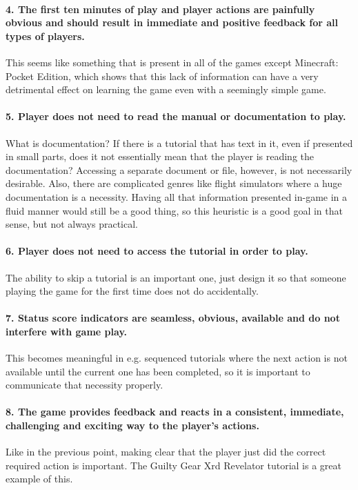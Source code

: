 \paragraph{4. The first ten minutes of play and player actions are painfully obvious and should result in immediate and positive feedback for all types of players. } This seems like something that is present in all of the games except Minecraft: Pocket Edition, which shows that this lack of information can have a very detrimental effect on learning the game even with a seemingly simple game.

\paragraph{5. Player does not need to read the manual or documentation to play.} What is documentation? If there is a tutorial that has text in it, even if presented in small parts, does it not essentially mean that the player is reading the documentation? Accessing a separate document or file, however, is not necessarily desirable. Also, there are complicated genres like flight simulators where a huge documentation is a necessity. Having all that information presented in-game in a fluid manner would still be a good thing, so this heuristic is a good goal in that sense, but not always practical.

\paragraph{6. Player does not need to access the tutorial in order to play.} The ability to skip a tutorial is an important one, just design it so that someone playing the game for the first time does not do accidentally.

\paragraph{7. Status score indicators are seamless, obvious, available and do not interfere with game play.}
This becomes meaningful in e.g. sequenced tutorials where the next action is not available until the current one has been completed, so it is important to communicate that necessity properly.

\paragraph{8. The game provides feedback and reacts in a consistent, immediate, challenging and exciting way to the player's actions.} Like in the previous point, making clear that the player just did the correct required action is important. The Guilty Gear Xrd Revelator tutorial is a great example of this.

